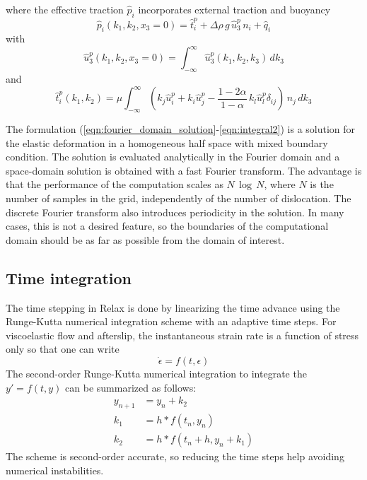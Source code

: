 \documentclass[10pt]{article}
\begin{document}
where the effective traction $\hat{p}_i$ incorporates external traction and buoyancy
\begin{equation}\label{eqn:last_degree_freedom}
\hat{p}_i(k_1,k_2,x_3=0)=\hat{t}^p_i+\Delta\rho\,g\,\hat{u}^p_3\,n_i+\hat{q}_i
\end{equation}
%
with
%
\begin{equation}\label{eqn:integral1}
\hat{u}_3^p(k_1,k_2,x_3=0)=\int_{-\infty}^\infty\hat{u}^p_3(k_1,k_2,k_3)\,dk_3
\end{equation}
and
\begin{equation}\label{eqn:integral2}
\hat{t}^p_i(k_1,k_2)=\mu\int_{-\infty}^\infty\left(k_j\hat{u}^p_i+k_i\hat{u}^p_j-\frac{1-2\alpha}{1-\alpha}\,k_l\hat{u}^p_l\delta_{ij}\right)\,n_j\,dk_3
\end{equation}


The formulation (\ref{eqn:fourier_domain_solution}-\ref{eqn:integral2}) is a solution for the elastic deformation in a homogeneous half space with mixed boundary condition. The solution is evaluated analytically in the Fourier domain and a space-domain solution is obtained with a fast Fourier transform. The advantage is that the performance of the computation scales as $N\,\log\,N$, where $N$ is the number of samples in the grid, independently of the number of dislocation. The discrete Fourier transform also introduces periodicity in the solution. In many cases, this is not a desired feature, so the boundaries of the computational domain should be as far as possible from the domain of interest.

\subsection{Time integration}

The time stepping in Relax is done by linearizing the time advance using the Runge-Kutta numerical integration scheme with an adaptive time steps.
For viscoelastic flow and afterslip, the instantaneous strain rate is a function of stress only so that one can write
\begin{equation}
\dot{\epsilon} = f(t,\epsilon)
\end{equation}
The second-order Runge-Kutta numerical integration to integrate the $y'=f(t,y)$ can be summarized as follows:
\begin{equation}
\begin{aligned}
y_{n+1} &= y_n + k_2\\
k_1 &= h * f(t_n, y_n)\\
k_2 &= h * f(t_n + h, y_n + k_1)
\end{aligned}
\end{equation}
The scheme is second-order accurate, so reducing the time steps help avoiding numerical instabilities.
\end{document}
